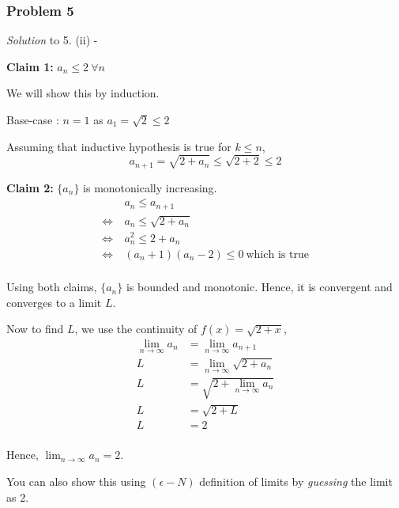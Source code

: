 \documentclass[
	11pt, %
]{beamer}
\begin{document}
\begin{frame}[t]
	\frametitle{Problem 5}

	\textit{Solution} to 5. (ii) -

	\bigskip

	\textbf{Claim 1:} $a_n \leq 2 ~ \forall n$
	
	\medskip
	
	We will show this by induction.

	\smallskip

	Base-case : $n = 1$ as $a_1 = \sqrt 2 \leq 2$

	Assuming that inductive hypothesis is true for $k \leq n$,
	\[a_{n+1} = \sqrt{2 + a_n} \leq \sqrt{2 + 2} \leq 2\]

	\medskip

	\textbf{Claim 2:} $\{a_n\}$ is monotonically increasing.
	\begin{align*}
		& a_n \leq a_{n+1} \\
		\Leftrightarrow ~ & a_n \leq \sqrt{2 + a_n} \\
		\Leftrightarrow ~ & a_n^2 \leq 2 + a_n \\
		\Leftrightarrow ~ & (a_n + 1)(a_n - 2) \leq 0 ~ \text{which is true}\\
	\end{align*}
	
\end{frame}

\begin{frame}[t]
	Using both claims, $\{a_n\}$ is bounded and monotonic. Hence, it is convergent and converges to a limit $L$.

	\medskip

	Now to find $L$, we use the continuity of $f(x) = \sqrt{2+x}$,
	\begin{align*}
		\lim_{n \to \infty} a_n &= \lim_{n \to \infty} a_{n+1} \\
		L &= \lim_{n \to \infty} \sqrt{2 + a_n} \\
		L &= \sqrt{2 + \lim_{n \to \infty} a_n} \\
		L &= \sqrt{2 + L} \\
		L &= 2 \\
	\end{align*}

	Hence, $\lim_{n \to \infty} a_n = 2$.

	\medskip

	You can also show this using $(\epsilon-N)$ definition of limits by \textit{guessing} the limit as 2.


\end{frame}
\end{document}
